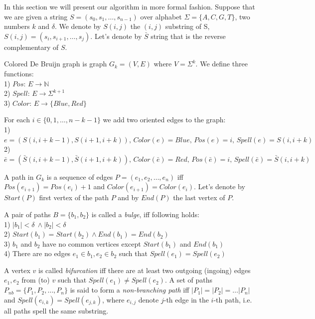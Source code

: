 \documentclass[a4paper,12pt]{scrartcl}
\begin{document}
In this section we will present our algorithm in more formal fashion. Suppose that we are given a string \(S = (s_{0}, s_{1}, \ldots, s_{n - 1})\)
over alphabet \(\Sigma = \lbrace A, C, G, T \rbrace\), two numbers \(k\) and \(\delta\). We denote by \(S(i, j)\) the \((i, j)\) substring of S,
\(S(i, j) = (s_{i}, s_{i + 1}, \ldots, s_{j}) \).  Let's denote by \(\bar{S}\) string that is the reverse complementary of \(S\). 

Colored De Bruijn graph is graph \(G_{k} = (V, E) \) where \(V = \Sigma ^ k \). We define three functions: \\
1) \(Pos : \, E \rightarrow \mathbb{N} \) \\
2) \(Spell : \, E \rightarrow \Sigma ^ {k + 1} \) \\
3) \(Color : \, E \rightarrow \lbrace Blue, Red \rbrace \) 

For each \(i \in \lbrace{0, 1, \ldots, n - k - 1} \rbrace \) we add two oriented edges to the graph: \\
1) \(e = (S(i, i + k - 1), S(i + 1, i + k)), \, Color(e) = Blue, \, Pos(e) = i, \, Spell(e) = S(i, i + k) \) \\
2) \(\bar{e} = (\bar{S}(i, i + k - 1), \bar{S}(i + 1, i + k)), \, Color(\bar{e}) = Red, \, Pos(\bar{e}) = i, \, Spell(\bar{e}) = \bar{S}(i, i + k) \)

A path in \(G_{k}\) is a sequence of edges \(P = (e_{1}, e_{2}, \ldots, e_{n})\) iff \(Pos(e_{i+1})  = Pos(e_{i}) + 1\) and
\(Color(e_{i + 1}) = Color(e_{i})\). Let's denote by \(Start(P)\) first vertex of the path \(P\) and by \(End(P)\) the last vertex of \(P\).

\newpage

A pair of paths \(B =\lbrace b_{1}, b_{2} \rbrace \)
is called a \textit{bulge}, iff following holds: \\
1) \(|b_{1}| < \delta\ \wedge |b_{2}| < \delta\) \\
2) \(Start(b_{1}) = Start(b_{2}) \wedge End(b_{1}) = End(b_{2}) \) \\
3) \(b_{1}\) and \(b_{2}\) have no common vertices except \(Start(b_{1})\) and \(End(b_{1})\) \\
4) There are no edges \(e_{1} \in b_{1}, e_{2} \in b_{2} \) such that \(Spell(e_{1}) = Spell(e_{2})\)

A vertex \(v\) is called \textit{bifurcation} iff there are at least two outgoing (ingoing) edges \(e_{1}, e_{2}\) 
from (to) \(v\) such that \(Spell(e_{1}) \neq Spell(e_{2})\). A set of paths \(P_{nb} = \lbrace P_{1}, P_{2}, \ldots, P_{n} \rbrace\)
is said to form a \textit{non-branching path} iff \(|P_{1}| = |P_{2}| = \ldots |P_{n}| \) and \(Spell(e_{i, k}) = Spell(e_{j, k}) \),
where \(e_{i, j}\) denote \(j\)-th edge in the \(i\)-th path, i.e. all paths spell the same substring.
\end{document}
